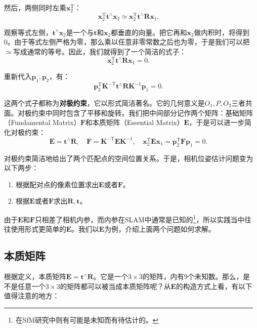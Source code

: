 然后，两侧同时左乘$\bm{x}_2^\mathrm{T}$：
\begin{equation}
\bm{x}_2^\mathrm{T} \bm{t}^\wedge \bm{x}_2 \simeq \bm{x}_2^\mathrm{T} \bm{t}^\wedge \bm{R} \bm{x}_1.
\end{equation}

观察等式左侧，$\bm{t}^\wedge \bm{x}_2$是一个与$\bm{t}$和$\bm{x}_2$都垂直的向量。把它再和$\bm{x}_2$做内积时，将得到0。由于等式左侧严格为零，那么乘以任意非零常数之后也为零，于是我们可以把$\simeq$写成通常的等号。因此，我们就得到了一个简洁的式子：
\begin{equation}
 \bm{x}_2^\mathrm{T} \bm{t}^\wedge \bm{R} \bm{x}_1 = 0.
\end{equation}

重新代入$\bm{p}_1, \bm{p}_2$，有：
\begin{equation}
\bm{p}_2^\mathrm{T} \bm{K}^{-\mathrm{T}} \bm{t}^\wedge \bm{R} \bm{K}^{-1} \bm{p}_1  = 0.
\end{equation}

这两个式子都称为\textbf{对极约束}，它以形式简洁著名。它的几何意义是$O_1, P, O_2$三者共面。对极约束中同时包含了平移和旋转。我们把中间部分记作两个矩阵：基础矩阵（Fundamental Matrix）$\bm{F}$和本质矩阵（Essential Matrix）$\bm{E}$，于是可以进一步简化对极约束：
\begin{equation}
\bm{E} = \bm{t}^ \wedge \bm{R}, \quad \bm{F} = \bm{K}^{ -\mathrm{T}} \bm{E} {\bm{K}^{ - 1}}, \quad \bm{x}_2^\mathrm{T} \bm{E} {\bm{x}_1} = \bm{p}_2^\mathrm{T} \bm{F} {\bm{p}_1} = 0.
\end{equation}

对极约束简洁地给出了两个匹配点的空间位置关系。于是，相机位姿估计问题变为以下两步：

\begin{enumerate}
	\item 根据配对点的像素位置求出$\bm{E}$或者$\bm{F}$。
	\item 根据$\bm{E}$或者$\bm{F}$求出$\bm{R}, \bm{t}$。
\end{enumerate}

由于$\bm{E}$和$\bm{F}$只相差了相机内参，而内参在SLAM中通常是已知的\footnote{在SfM研究中则有可能是未知而有待估计的。}，所以实践当中往往使用形式更简单的$\bm{E}$。我们以$\bm{E}$为例，介绍上面两个问题如何求解。

\subsection{本质矩阵}
根据定义，本质矩阵$\bm{E} = \bm{t}^\wedge \bm{R}$。它是一个$3\times 3$的矩阵，内有9个未知数。那么，是不是任意一个$3 \times 3$的矩阵都可以被当成本质矩阵呢？从$\bm{E}$的构造方式上看，有以下值得注意的地方：


